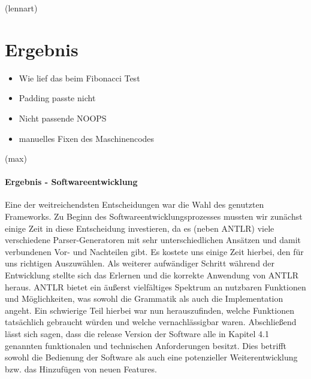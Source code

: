 \documentclass[paper=a4,fontsize=12pt,twocolumn]{scrreprt}
\begin{document}

(lennart)

\chapter{Ergebnis}




\begin{itemize}
    \item Wie lief das beim Fibonacci Test
    \item Padding passte nicht
    \item Nicht passende NOOPS
    \item manuelles Fixen des Maschinencodes
\end{itemize}



(max)

\subsubsection{Ergebnis - Softwareentwicklung}
Eine der weitreichendsten Entscheidungen war die Wahl des genutzten Frameworks.
Zu Beginn des Softwareentwicklungsprozesses mussten wir zunächst einige Zeit in diese Entscheidung investieren, da es (neben ANTLR) viele verschiedene Parser-Generatoren mit sehr unterschiedlichen Ansätzen und damit verbundenen Vor- und Nachteilen gibt.
Es kostete uns einige Zeit hierbei, den für uns richtigen Auszuwählen.
Als weiterer aufwändiger Schritt während der Entwicklung stellte sich das Erlernen und die korrekte Anwendung von ANTLR heraus.
ANTLR bietet ein äußerst vielfältiges Spektrum an nutzbaren Funktionen und Möglichkeiten, was sowohl die Grammatik als auch die Implementation angeht.
Ein schwierige Teil hierbei war nun herauszufinden, welche Funktionen tatsächlich gebraucht würden und welche vernachlässigbar waren.
Abschließend lässt sich sagen, dass die release Version der Software alle in Kapitel 4.1
genannten funktionalen und technischen Anforderungen besitzt.
Dies betrifft sowohl die Bedienung  der Software als auch eine potenzieller Weiterentwicklung bzw. das Hinzufügen von neuen Features. 
\end{document}
